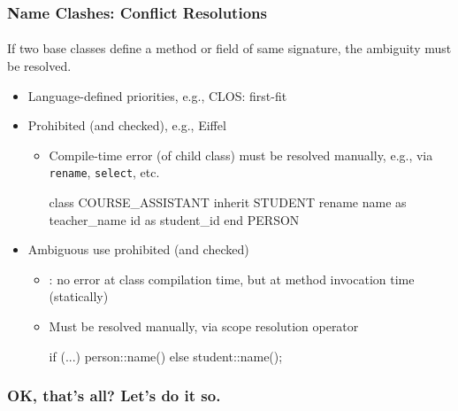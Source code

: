 \documentclass[handout]{beamer}
\begin{document}
\begin{frame}[fragile]
\frametitle{Name Clashes: Conflict Resolutions}
\framesubtitle{}

If two base classes define a method or field of same signature,
the ambiguity must be resolved. 

\medskip

\begin{itemize}
\item<+-> Language-defined priorities, e.g., CLOS: first-fit
\item<+-> Prohibited (and checked), e.g., Eiffel
\begin{itemize}
\item Compile-time error (of child class) must be resolved manually,
  e.g., via \texttt{rename}, \texttt{select}, etc.
\begin{eiffel}
class COURSE_ASSISTANT
inherit
      STUDENT
          rename
              name as teacher_name
              id   as student_id
          end
      PERSON
\end{eiffel}
\end{itemize}
\item<+-> Ambiguous \alert{use} prohibited (and checked)
\begin{itemize}
\item \Cpp: no error at class compilation time, but at method invocation
time (statically)
\item Must be resolved manually,  via scope resolution operator
\begin{cplus3}
if (...) person::name() else student::name(); 
\end{cplus3} 
\end{itemize}
\end{itemize}
\end{frame}


\begin{frame}[fragile]
\frametitle{OK, that's all? Let's do it  so.}
\framesubtitle{}
\begin{overlayarea}{\textwidth}{0.55\textheight}\centering
{}
\end{overlayarea}

\end{frame}
\end{document}
